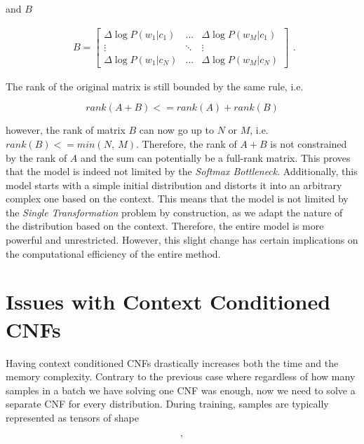 and $ B $

\begin{displaymath}
    \begin{matrix}
    B = \begin{bmatrix}
       \Delta \log P(w_1 | c_1) & \hdots & \Delta \log P(w_M | c_1) \\
       \vdots & \ddots & \vdots \\
       \Delta \log P(w_1 | c_N) & \hdots & \Delta \log P(w_M | c_N)
      \end{bmatrix}
    \end{matrix}.
\end{displaymath}

The rank of the original matrix is still bounded by the same rule, i.e.

\begin{displaymath}
    rank(A + B) <= rank(A) + rank(B)
\end{displaymath}

however, the rank of matrix $ B $ can now go up to $ N $ or $ M $, i.e. $ rank(B) <= min(N, \ M) $. Therefore, the rank of $ A + B $ is not constrained by the rank of $ A $ and the sum can potentially be a full-rank matrix. This proves that the model is indeed not limited by the \emph{Softmax Bottleneck}. Additionally, this model starts with a simple initial distribution and distorts it into an arbitrary complex one based on the context. This means that the model is not limited by the \emph{Single Transformation} problem by construction, as we adapt the nature of the distribution based on the context. Therefore, the entire model is more powerful and unrestricted. However, this slight change has certain implications on the computational efficiency of the entire method.

\section{Issues with Context Conditioned CNFs}
\label{section:cnf_lm:issues_cc_cnfs}

Having context conditioned CNFs drastically increases both the time and the memory complexity. Contrary to the previous case where regardless of how many samples in a batch we have solving one CNF was enough, now we need to solve a separate CNF for every distribution. During training, samples are typically represented as tensors of shape

\begin{displaymath}
    [batch\_size, \ sequence\_size, \ embedding\_size],
\end{displaymath}


